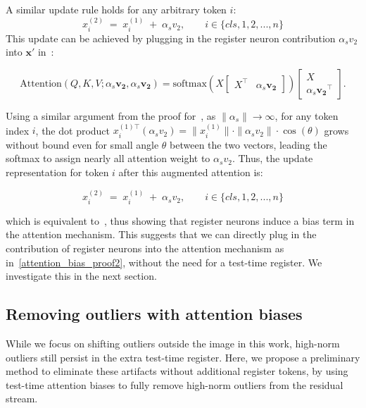 \documentclass{article}
\begin{document}
A similar update rule holds for any arbitrary token $i$:
\begin{equation}
  x^{(2)}_{i} \;=\; x^{(1)}_{i} \;+\; \alpha_sv_2,
  \qquad i \in \{cls, 1, 2, ..., n\}
  \label{attention_update_decomposition3}
\end{equation}
This update can be achieved by plugging in the register neuron contribution $\alpha_sv_2$ into $\mathbf{x'}$ in~:

\begin{equation}
\text{Attention}(Q, K, V; \alpha_s\mathbf{v_2}, \alpha_s\mathbf{v_2}) =
\text{softmax}\!\left(
X \begin{bmatrix} X^\top & \alpha_s\mathbf{v_2} \end{bmatrix}
\right)
\begin{bmatrix} X \\ \alpha_s\mathbf{v_2}^{\!\top} \end{bmatrix}.
\label{attention_bias_proof2}
\end{equation}


Using a similar argument from the proof for~, as \( \|\alpha_s\| \to \infty \), for any token index $i$, the dot product $x^{(1)\top}_{i} (\alpha_sv_2) = \|x^{(1)}_{i}\| \cdot \|\alpha_sv_2 \| \cdot \cos(\theta)$
grows without bound even for small angle \( \theta \) between the two vectors, leading the softmax to assign nearly all attention weight to $\alpha_sv_2$. Thus, the update representation for token $i$ after this augmented attention is: 

\begin{equation}
  x^{(2)}_{i} \;=\; x^{(1)}_{i} \;+\; \alpha_sv_2,
  \qquad i \in \{cls, 1, 2, ..., n\}
\end{equation}

which is equivalent to~, thus showing that register neurons induce a bias term in the attention mechanism. This suggests that we can directly plug in the contribution of register neurons into the attention mechanism as in~\cref{attention_bias_proof2}, without the need for a test-time register. We investigate this in the next section. 


\subsection{Removing outliers with attention biases}
\label{appendix:attention_bias}

While we focus on shifting outliers outside the image in this work, high-norm outliers still persist in the extra test-time register. Here, we propose a preliminary method to eliminate these artifacts without additional register tokens, by using test-time attention biases to fully remove high-norm outliers from the residual stream.
\end{document}
